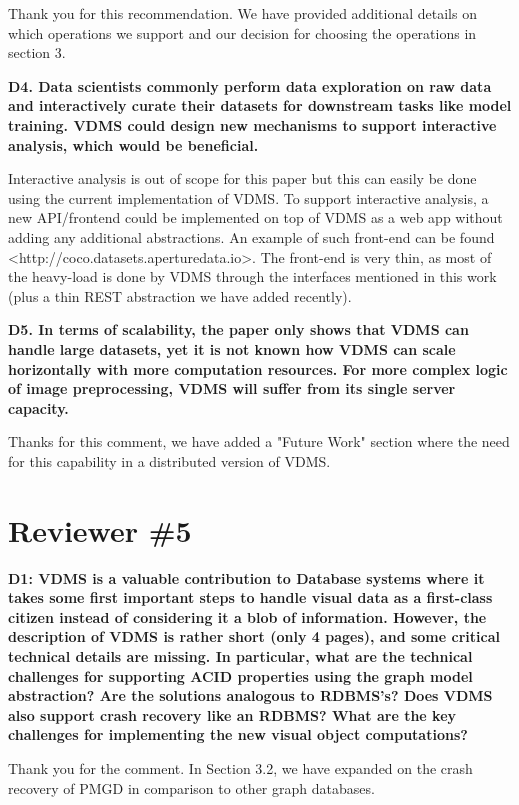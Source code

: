 \documentclass[11pt]{proposalnsf}
\begin{document}
Thank you for this recommendation.
We have provided additional details on which operations we support and our
decision for choosing the operations in section 3.

\bigskip
\textbf{
D4. Data scientists commonly perform data exploration on raw data and interactively
curate their datasets for downstream tasks like model training.
VDMS could design new mechanisms to support interactive analysis,
which would be beneficial.
}\bigskip

Interactive analysis is out of scope for this paper but this can easily be done
using the current implementation of VDMS.
To support interactive analysis, a new API/frontend could be implemented on top of
VDMS as a web app without adding any additional abstractions.
An example of such front-end can be found <http://coco.datasets.aperturedata.io>.
The front-end is very thin, as most of the heavy-load is done by VDMS through
the interfaces mentioned in this work
(plus a thin REST abstraction we have added recently).

\bigskip
\textbf{
D5. In terms of scalability, the paper only shows that VDMS can handle large
datasets, yet it is not known how VDMS can scale horizontally with more
computation resources.
For more complex logic of image preprocessing, VDMS will suffer from its
single server capacity.
}\bigskip

Thanks for this comment, we have added a "Future Work" section where the need
for this capability in a distributed version of VDMS.

\newpage
\section{Reviewer \#5}

\bigskip
\textbf{
D1: VDMS is a valuable contribution to Database systems where it takes
some first important steps to handle visual data as a first-class citizen
instead of considering it a blob of information. However, the description
of VDMS is rather short (only 4 pages), and some critical technical
details are missing. In particular, what are the technical challenges
for supporting ACID properties using the graph model abstraction? Are
the solutions analogous to RDBMS’s? Does VDMS also support crash
recovery like an RDBMS? What are the key challenges for implementing
the new visual object computations?
}\bigskip

Thank you for the comment.
In Section 3.2, we have expanded on the crash recovery of PMGD in
comparison to other graph databases.
\end{document}

